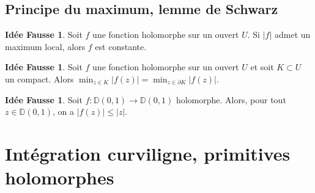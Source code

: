 \documentclass[11pt,a4paper]{article}
\newcommand{\D}{\mathbb{D}}
\newcommand{\R}{\mathbb{R}}
\theoremstyle{definition}
\newtheorem{ideeFausse}[theoreme]{Idée Fausse}
\theoremstyle{plain}
\begin{document}
\subsection{Principe du maximum, lemme de Schwarz}

\begin{ideeFausse}
Soit $f$ une fonction holomorphe sur un ouvert $U$.
Si $|f|$ admet un maximum local, alors $f$ est constante.
\end{ideeFausse}


\begin{ideeFausse}
Soit $f$ une fonction holomorphe sur un ouvert $U$ et soit $K\subset U$ un compact.
Alors $\min_{z\in K} |f(z)| = \min_{z\in \partial K} |f(z)|$.
\end{ideeFausse}






\begin{ideeFausse}
Soit $f : \D(0,1)\to \D(0,1)$ holomorphe.
Alors, pour tout $z\in \D(0,1)$, on a $|f(z)| \leq |z|$.
\end{ideeFausse}



%
%



\section{Intégration curviligne, primitives holomorphes}



\end{document}
